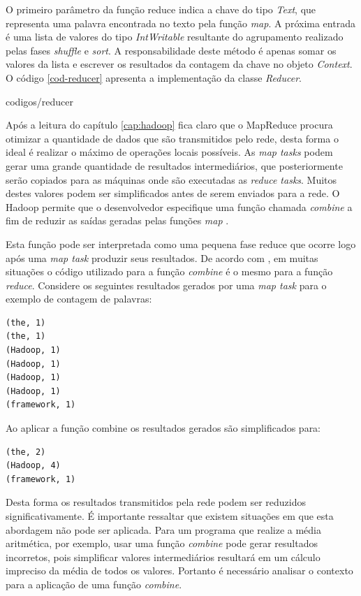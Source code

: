 O primeiro parâmetro da função reduce indica a chave do tipo \textit{Text}, que representa uma palavra encontrada no texto pela função \textit{map}. A próxima entrada é uma lista de valores do tipo \textit{IntWritable} resultante do agrupamento realizado pelas fases \textit{shuffle} e \textit{sort}. A responsabilidade deste método é apenas somar os valores da lista e escrever os resultados da contagem da chave no objeto \textit{Context}. O código \ref{cod-reducer} apresenta a implementação da classe \textit{Reducer}.


		{codigos/reducer}

Após a leitura do capítulo \ref{cap:hadoop} fica claro que o MapReduce procura otimizar a quantidade de dados que são transmitidos pelo rede, desta forma o ideal é realizar o máximo de operações locais possíveis. As \textit{map tasks} podem gerar uma grande quantidade de resultados intermediários, que posteriormente serão copiados para as máquinas onde são executadas as \textit{reduce tasks}. Muitos destes valores podem ser simplificados antes de serem enviados para a rede. O Hadoop permite que o desenvolvedor especifique uma função chamada \textit{combine} a fim de reduzir as saídas geradas pelas funções \textit{map} \cite{white2012}.

Esta função pode ser interpretada como uma pequena fase reduce que ocorre logo após uma \textit{map task} produzir seus resultados. De acordo com , em muitas situações o código utilizado para a função \textit{combine} é o mesmo para a função \textit{reduce}. Considere os seguintes resultados gerados por uma \textit{map task} para o exemplo de contagem de palavras:

\begin{lstlisting}[style=abnt,frame=none]
(the, 1)
(the, 1)
(Hadoop, 1)
(Hadoop, 1)
(Hadoop, 1)
(Hadoop, 1)
(framework, 1)
\end{lstlisting}

Ao aplicar a função combine os resultados gerados são simplificados para:

\begin{lstlisting}[style=abnt,frame=none]
(the, 2)
(Hadoop, 4)
(framework, 1)
\end{lstlisting}

Desta forma os resultados transmitidos pela rede podem ser reduzidos significativamente. É importante ressaltar que existem situações em que esta abordagem não pode ser aplicada. Para um programa que realize a média aritmética, por exemplo, usar uma função \textit{combine} pode gerar resultados incorretos, pois simplificar valores intermediários resultará em um cálculo impreciso da média de todos os valores. Portanto é necessário analisar o contexto para a aplicação de uma função \textit{combine}.

